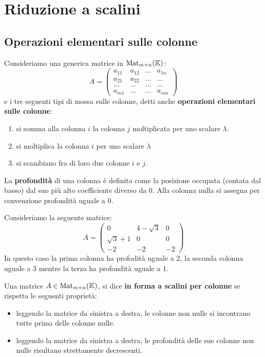 \chapter{Riduzione a scalini}
\section{Operazioni elementari sulle colonne}
Consideriamo una generica matrice in $\operatorname{Mat}_{m \times n}(\mathbb{K})$:
\[
	A = \begin{pmatrix}
		a_{11} & a_{12} & \dots & a_{1n} \\
		a_{21} & a_{22} & \dots & \dots  \\
		\dots  & \dots  & \dots & \dots  \\
		a_{m1} & \dots  & \dots & a_{mn}
	\end{pmatrix}
\]
e i tre seguenti tipi di mossa sulle colonne, detti anche
\textbf{operazioni elementari sulle colonne}:
\begin{enumerate}
	\item si somma alla colonna $i$ la colonna $j$ moltiplicata per uno scalare
	      $\lambda$.
	\item si moltiplica la colonna $i$ per uno scalare $\lambda$
	\item si scambiano fra di loro due colonne $i$ e $j$.
\end{enumerate}

\begin{definition}
	La \textbf{profondità} di una colonna è definita come la posizione
	occupata (contata dal basso) dal suo più alto coefficiente diverso da 0.
	Alla colonna nulla si assegna per convenzione profondità uguale a 0.
\end{definition}

\begin{example}
	Consideriamo la seguente matrice:
	\[
		A = \begin{pmatrix}
			0            & 4 - \sqrt{3} & 0  \\
			\sqrt{3} + 1 & 0            & 0  \\
			-2           & -2           & -2
		\end{pmatrix}
	\]
	In questo caso la prima colonna ha profodità uguale a 2, la
	seconda colonna uguale a 3 mentre la terza ha profondità uguale a 1.
\end{example}

\begin{definition}
	Una matrice $A \in \operatorname{Mat}_{m \times n}(\mathbb{K})$, si dice
	\textbf{in forma a scalini per colonne} se rispetta le seguenti proprietà:
	\begin{itemize}
		\item leggendo la matrice da sinistra a destra, le colonne non nulle si
		      incontrano tutte prima delle colonne nulle.
		\item leggendo la matrice da sinistra a destra, le profondità
		      delle sue colonne non nulle risultano strettamente
		      decrescenti.
	\end{itemize}
\end{definition}

